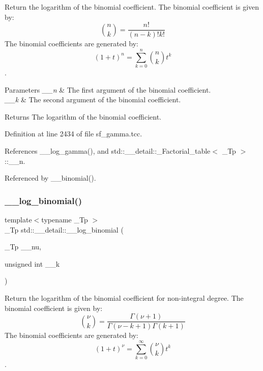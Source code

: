 Return the logarithm of the binomial coefficient. The binomial coefficient is given by\+: \[ \binom{n}{k} = \frac{n!}{(n-k)! k!} \] The binomial coefficients are generated by\+: \[ \left(1 + t\right)^n = \sum_{k=0}^n \binom{n}{k} t^k \]. 


\begin{DoxyParams}{Parameters}
{\em \+\_\+\+\_\+n} & The first argument of the binomial coefficient. \\
\hline
{\em \+\_\+\+\_\+k} & The second argument of the binomial coefficient. \\
\hline
\end{DoxyParams}
\begin{DoxyReturn}{Returns}
The logarithm of the binomial coefficient. 
\end{DoxyReturn}


Definition at line 2434 of file sf\+\_\+gamma.\+tcc.



References \+\_\+\+\_\+log\+\_\+gamma(), and std\+::\+\_\+\+\_\+detail\+::\+\_\+\+Factorial\+\_\+table$<$ \+\_\+\+Tp $>$\+::\+\_\+\+\_\+n.



Referenced by \+\_\+\+\_\+binomial().

\mbox{\label{namespacestd_1_1____detail_af8613458310f575d1a1b162553abe4aa}} 
\subsubsection{\texorpdfstring{\+\_\+\+\_\+log\+\_\+binomial()}{\_\_log\_binomial()}\hspace{0.1cm}{\footnotesize\ttfamily [2/2]}}
{\footnotesize\ttfamily template$<$typename \+\_\+\+Tp $>$ \\
\+\_\+\+Tp std\+::\+\_\+\+\_\+detail\+::\+\_\+\+\_\+log\+\_\+binomial (\begin{DoxyParamCaption}\item[{\+\_\+\+Tp}]{\+\_\+\+\_\+nu,  }\item[{unsigned int}]{\+\_\+\+\_\+k }\end{DoxyParamCaption})}



Return the logarithm of the binomial coefficient for non-\/integral degree. The binomial coefficient is given by\+: \[ \binom{\nu}{k} = \frac{\Gamma(\nu+1)}{\Gamma(\nu-k+1) \Gamma(k+1)} \] The binomial coefficients are generated by\+: \[ \left(1 + t\right)^\nu = \sum_{k=0}^\infty \binom{\nu}{k} t^k \]. 


